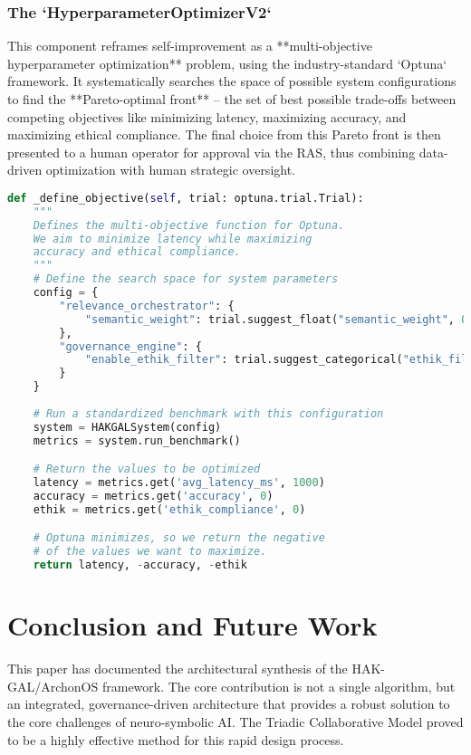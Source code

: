 \documentclass[11pt, a4paper]{article}
\begin{document}
\subsubsection{The `HyperparameterOptimizerV2`}
This component reframes self-improvement as a **multi-objective hyperparameter optimization** problem, using the industry-standard `Optuna` framework. It systematically searches the space of possible system configurations to find the **Pareto-optimal front** – the set of best possible trade-offs between competing objectives like minimizing latency, maximizing accuracy, and maximizing ethical compliance. The final choice from this Pareto front is then presented to a human operator for approval via the RAS, thus combining data-driven optimization with human strategic oversight.

\begin{lstlisting}[language=Python, caption={The Optuna Objective Function for Multi-Objective Optimization}, label={lst:optuna}]
def _define_objective(self, trial: optuna.trial.Trial):
    """
    Defines the multi-objective function for Optuna.
    We aim to minimize latency while maximizing
    accuracy and ethical compliance.
    """
    # Define the search space for system parameters
    config = {
        "relevance_orchestrator": {
            "semantic_weight": trial.suggest_float("semantic_weight", 0.1, 0.9),
        },
        "governance_engine": {
            "enable_ethik_filter": trial.suggest_categorical("ethik_filter", [True, False]),
        }
    }
    
    # Run a standardized benchmark with this configuration
    system = HAKGALSystem(config)
    metrics = system.run_benchmark()

    # Return the values to be optimized
    latency = metrics.get('avg_latency_ms', 1000)
    accuracy = metrics.get('accuracy', 0)
    ethik = metrics.get('ethik_compliance', 0)

    # Optuna minimizes, so we return the negative
    # of the values we want to maximize.
    return latency, -accuracy, -ethik
\end{lstlisting}

\section{Conclusion and Future Work}
This paper has documented the architectural synthesis of the HAK-GAL/ArchonOS framework. The core contribution is not a single algorithm, but an integrated, governance-driven architecture that provides a robust solution to the core challenges of neuro-symbolic AI. The Triadic Collaborative Model proved to be a highly effective method for this rapid design process.
\end{document}
